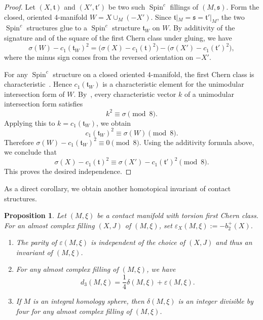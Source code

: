 \documentclass{amsart}
\numberwithin{equation}{section}
\numberwithin{figure}{section}
\newtheorem{proposition}[theorem]{Proposition}
\theoremstyle{definition}
\theoremstyle{remark}
\let\olddxi\xi %
\renewcommand{\xi}{\olddxi}
\begin{document}
\begin{proof}
Let \((X,\mathfrak t)\) and \((X',\mathfrak t')\) be two such \(\operatorname{Spin}^c\) fillings of \((M,\mathfrak s)\). Form the closed, oriented \(4\)-manifold \(W=X\cup_M(-X')\). Since \(\mathfrak t|_M=\mathfrak s=\mathfrak t'|_M\), the two \(\operatorname{Spin}^c\) structures glue to a \(\operatorname{Spin}^c\) structure \(\mathfrak t_W\) on \(W\).
By additivity of the signature and of the square of the first Chern class under gluing, we have
\[
\sigma(W)-c_1(\mathfrak t_W)^2
=
\bigl(\sigma(X)-c_1(\mathfrak t)^2\bigr)
-
\bigl(\sigma(X')-c_1(\mathfrak t')^2\bigr),
\]
where the minus sign comes from the reversed orientation on \(-X'\).

For any \(\operatorname{Spin}^c\) structure on a closed oriented \(4\)-manifold, the first Chern class is characteristic~\cite[Proposition~2.4.16]{Gompf_Stipsicz}. Hence \(c_1(\mathfrak t_W)\) is a characteristic element for the unimodular intersection form of \(W\). By~\cite[Lemma~1.2.20]{Gompf_Stipsicz}, every characteristic vector \(k\) of a unimodular intersection form satisfies
\[
k^2\equiv \sigma \pmod 8.
\]
Applying this to \(k=c_1(\mathfrak t_W)\), we obtain
\[
c_1(\mathfrak t_W)^2\equiv \sigma(W)\pmod 8.
\]
Therefore \(\sigma(W)-c_1(\mathfrak t_W)^2\equiv 0\pmod 8\). Using the additivity formula above, we conclude that
\[
\sigma(X)-c_1(\mathfrak t)^2
\equiv
\sigma(X')-c_1(\mathfrak t')^2
\pmod 8.
\]
This proves the desired independence.
\end{proof}

As a direct corollary, we obtain another homotopical invariant of contact structures. 

\begin{proposition} Let $(M,\xi)$ be a contact manifold with torsion first Chern class. For an almost complex filling \((X,J)\) of \((M,\xi)\), set $\varepsilon_X(M,\xi):=-b_2^+(X)$.
\begin{enumerate}
    \item The parity of $\varepsilon(M,\xi)$ is independent of the choice of $(X,J)$ and thus an invariant of $(M,\xi)$.
    \item For any almost complex filling of $(M,\xi)$, we have
    \begin{equation*}
        d_3(M,\xi)=\frac{1}{4}\delta(M,\xi)+\varepsilon(M,\xi).
    \end{equation*}
    \item If $M$ is an integral homology sphere, then $\delta(M,\xi)$ is an integer divisible by four for any almost complex filling of $(M,\xi)$.
\end{enumerate}
\end{proposition}
\end{document}
